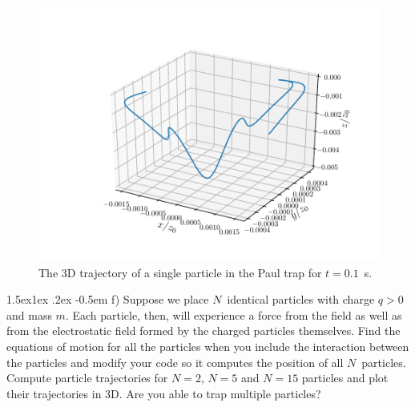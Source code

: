 \documentclass[%
oneside,                 %
final,                   %
10pt]{article}
\makeatletter
\newenvironment{doconceexercise}{}{}
\newcommand\subex{\@startsection{paragraph}{4}{\z@}%
                  {1.5ex\@plus1ex \@minus.2ex}%
                  {-0.5em}%
                  {\normalfont\normalsize\bfseries}}
\makeatother
\begin{document}
\begin{doconceexercise}
\begin{figure}[!ht]  %
  \centerline{\includegraphics[width=0.8\linewidth]{figures/paul_trap_particles_only_one_total_time_0.1.pdf}}
  \caption{
  The 3D trajectory of a single particle in the Paul trap for $t = 0.1$ s. \label{fig:one_particle_trajectory}
  }
\end{figure}



\subex{f)}
Suppose we place $N$ identical particles with charge $q > 0$ and mass $m$. Each particle, then, will experience a force from the field as well as from the electrostatic field formed by the charged particles themselves. Find the equations of motion for all the particles when you include the interaction between the particles and modify your code so it computes the position of all $N$ particles. Compute particle trajectories for $N = 2$, $N = 5$ and $N = 15$ particles and plot their trajectories in 3D. Are you able to trap multiple particles?



\end{doconceexercise}
\end{document}
